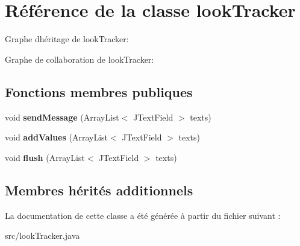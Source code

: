 \hypertarget{classlookTracker}{}\section{Référence de la classe look\+Tracker}
\label{classlookTracker}


Graphe d\textquotesingle{}héritage de look\+Tracker\+:


Graphe de collaboration de look\+Tracker\+:
\subsection*{Fonctions membres publiques}
\begin{DoxyCompactItemize}
\item 
\mbox{\label{classlookTracker_af8d4a23472dc2684a95459f5e047010c}} 
void {\bfseries send\+Message} (Array\+List$<$ J\+Text\+Field $>$ texts)
\item 
\mbox{\label{classlookTracker_af54eb3804a4d0f212596bb01eaae26b3}} 
void {\bfseries add\+Values} (Array\+List$<$ J\+Text\+Field $>$ texts)
\item 
\mbox{\label{classlookTracker_a5bb2c507665480050e2a3e5f14184688}} 
void {\bfseries flush} (Array\+List$<$ J\+Text\+Field $>$ texts)
\end{DoxyCompactItemize}
\subsection*{Membres hérités additionnels}


La documentation de cette classe a été générée à partir du fichier suivant \+:\begin{DoxyCompactItemize}
\item 
src/look\+Tracker.\+java\end{DoxyCompactItemize}
